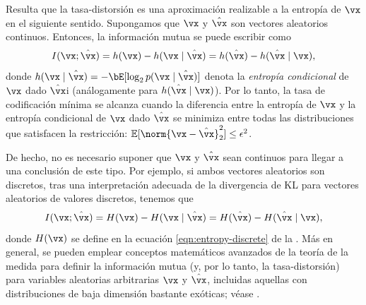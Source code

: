 \documentclass[../../book-main.tex]{subfiles}
\begin{document}
\begin{remark}
    Resulta que la tasa-distorsión es una aproximación realizable
    a la entropía de $\vx$ en el siguiente sentido.
    Supongamos que $\vx$ y $\hat{\vx}$ son vectores aleatorios continuos.
    Entonces, la información mutua se puede escribir como
    \begin{equation}\label{eq:information-entropy}
        I(\vx; \hat\vx) = h(\vx) - h(\vx \mid \hat \vx) = h(\hat \vx) - h(\hat \vx \mid \vx),
    \end{equation}
    donde $h(\vx \mid \hat \vx) = -\bE[\log_2 p(\vx \mid \hat\vx)]$ denota la
    \textit{entropía condicional} de $\vx$ dado $\hat \vx$i (análogamente para $h(\hat \vx \mid \vx)$).
    Por lo tanto, la tasa de codificación mínima se alcanza cuando la diferencia entre la
    entropía de $\vx$ y la entropía condicional de $\vx$ dado $\hat \vx$
    se minimiza entre todas las distribuciones que satisfacen
    la restricción: $\mathbb{E} [\norm{\vx- \hat \vx}_2^2] \le \epsilon^2$.

    De hecho, no es necesario suponer que $\vx$ y $\hat \vx$ sean continuos
    para llegar a una conclusión de este tipo. Por ejemplo, si ambos vectores aleatorios
    son discretos, tras una interpretación adecuada de la divergencia de KL
    para vectores aleatorios de valores discretos, tenemos que
    \begin{equation}\label{eq:mutual}
        I(\vx; \hat\vx) = H(\vx) - H(\vx \mid \hat \vx) = H(\hat \vx) - H(\hat \vx \mid \vx),
    \end{equation}
    donde $H(\vx)$ se define en la ecuación \eqref{eqn:entropy-discrete} de la
    .
    Más en general, se pueden emplear conceptos matemáticos avanzados de la teoría de la medida
    para definir la información mutua (y, por lo tanto, la tasa-distorsión) para variables aleatorias arbitrarias
    $\vx$ y $\hat \vx$, incluidas aquellas con distribuciones de baja dimensión bastante
    exóticas; véase \textcite[\S 8.5]{Cover-Thomas}.
\end{remark}
\end{document}
